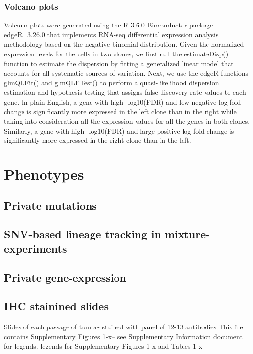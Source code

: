 \documentclass{article}
\begin{document}
\subsubsection{Volcano plots}
Volcano plots were generated using the R 3.6.0 Bioconductor package edgeR\_3.26.0 that implements RNA-seq differential expression analysis methodology based on the negative binomial distribution. Given the normalized expression levels for the cells in two clones, we first call the estimateDisp() function to estimate the dispersion by fitting a generalized linear model that accounts for all systematic sources of variation. Next, we use the edgeR functions glmQLFit() and glmQLFTest() to perform a quasi-likelihood dispersion estimation and hypothesis testing that assigns false discovery rate values to each gene. In plain English, a gene with high -log10(FDR) and low negative log fold change is significantly more expressed in the left clone than in the right while taking into consideration all the expression values for all the genes in both clones. Similarly, a gene with high -log10(FDR) and large positive log fold change is significantly more expressed in the right clone than in the left. 






\section{Phenotypes}
\subsection{Private mutations}
\subsection{SNV-based lineage tracking in mixture-experiments}
\subsection{Private gene-expression}








\subsection{IHC stainined slides}
Slides of each passage of tumor- stained with panel of 12-13 antibodies
This file contains Supplementary Figures 1-x– see Supplementary Information document for legends.
legends for Supplementary Figures 1-x and Tables 1-x
\end{document}
